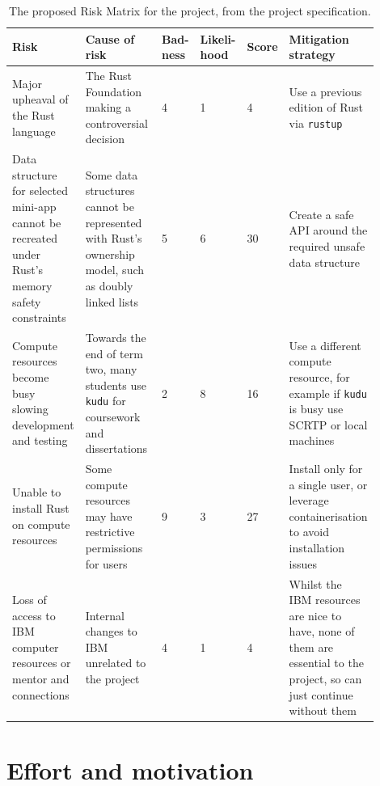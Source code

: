 \begin{table}[H]
\begin{adjustwidth}{-3em}{-3em}
    \centering
    \caption{The proposed Risk Matrix for the project, from the project specification.}
    \label{tab:risk_matrix}
    \begin{tabular}{|p{0.2\linewidth}|p{0.25\linewidth}|p{0.065\linewidth}|p{0.085\linewidth}|p{0.055\linewidth}|p{0.24\linewidth}|} \hline
         Risk&  Cause of risk&  Bad- ness&  Likeli- hood&  Score& Mitigation strategy\\ \hline
         Major upheaval of the Rust language&  The Rust Foundation making a controversial decision \cite{AmNoLonger2023} \cite{AddRFCGovernance} \cite{TelemetryGoToolchain}&  4&  1&  \cellcolor{green!25}4 & Use a previous edition of Rust via \texttt{rustup}\\ \hline 
         Data structure for selected mini-app cannot be recreated under Rust's memory safety
  constraints&  Some data structures cannot be represented with Rust's ownership model, such as doubly linked lists \cite{leeBuildingMemorysafeNetwork2017}&  5&  6&  \cellcolor{red!25}30& Create a safe API around the required unsafe data structure\\ \hline 
         Compute resources become busy slowing development and testing&    Towards the end of term two, many students use \texttt{kudu} for coursework and dissertations&  2&  8&  \cellcolor{orange!25}16& Use a different compute resource, for example if \texttt{kudu} is busy use SCRTP or local machines\\ \hline 
         Unable to install Rust on compute resources&  Some compute resources may have restrictive permissions for users&  9&  3&  \cellcolor{red!25}27& Install only for a single user, or leverage containerisation to avoid installation issues\\ \hline 
 Loss of access to IBM computer resources or mentor and connections& Internal changes to IBM unrelated to the project& 4& 1& \cellcolor{green!25}4 &Whilst the IBM resources are nice to have, none of them are essential to the project, so can just continue without them\\ \hline
    \end{tabular}
    \end{adjustwidth}
\end{table}

\section{Effort and motivation}
\label{sec:effort-and-motivation}

